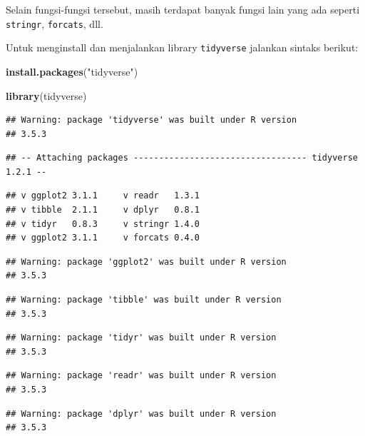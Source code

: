 \documentclass[]{book}
\newenvironment{Shaded}{\begin{snugshade}}{\end{snugshade}}
\newcommand{\KeywordTok}[1]{\textcolor[rgb]{0.13,0.29,0.53}{\textbf{#1}}}
\newcommand{\StringTok}[1]{\textcolor[rgb]{0.31,0.60,0.02}{#1}}
\newcommand{\NormalTok}[1]{#1}
\begin{document}
Selain fungsi-fungsi tersebut, masih terdapat banyak fungsi lain yang
ada seperti \texttt{stringr}, \texttt{forcats}, dll.

Untuk menginstall dan menjalankan library \texttt{tidyverse} jalankan
sintaks berikut:

\begin{Shaded}
\begin{Highlighting}[]
\KeywordTok{install.packages}\NormalTok{(}\StringTok{"tidyverse"}\NormalTok{)}
\end{Highlighting}
\end{Shaded}

\begin{Shaded}
\begin{Highlighting}[]
\KeywordTok{library}\NormalTok{(tidyverse)}
\end{Highlighting}
\end{Shaded}

\begin{verbatim}
## Warning: package 'tidyverse' was built under R version
## 3.5.3
\end{verbatim}

\begin{verbatim}
## -- Attaching packages ---------------------------------- tidyverse 1.2.1 --
\end{verbatim}

\begin{verbatim}
## v ggplot2 3.1.1     v readr   1.3.1
## v tibble  2.1.1     v dplyr   0.8.1
## v tidyr   0.8.3     v stringr 1.4.0
## v ggplot2 3.1.1     v forcats 0.4.0
\end{verbatim}

\begin{verbatim}
## Warning: package 'ggplot2' was built under R version
## 3.5.3
\end{verbatim}

\begin{verbatim}
## Warning: package 'tibble' was built under R version
## 3.5.3
\end{verbatim}

\begin{verbatim}
## Warning: package 'tidyr' was built under R version
## 3.5.3
\end{verbatim}

\begin{verbatim}
## Warning: package 'readr' was built under R version
## 3.5.3
\end{verbatim}

\begin{verbatim}
## Warning: package 'dplyr' was built under R version
## 3.5.3
\end{verbatim}
\end{document}
